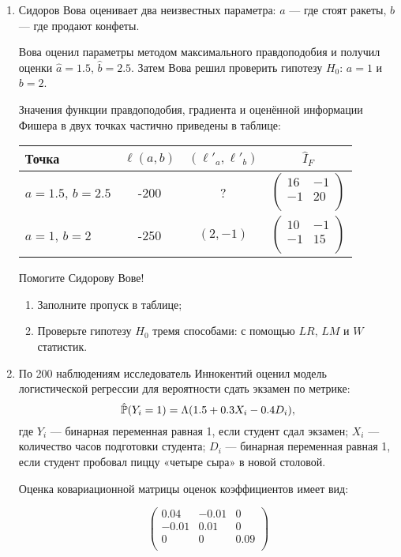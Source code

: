 \begin{enumerate}
  \item Сидоров Вова оценивает два неизвестных параметра: $a$ — где стоят ракеты, $b$ — где продают конфеты.

  Вова оценил параметры методом максимального правдоподобия и получил оценки $\hat a = 1.5$, $\hat b = 2.5$.
  Затем Вова решил проверить гипотезу $H_0$: $a=1$ и $b=2$.

  Значения функции правдоподобия, градиента и оценённой информации Фишера в двух точках
  частично приведены в таблице:


\begin{tabular}{lccc}
\toprule
Точка & $\ell(a, b)$ & $(\ell'_a, \ell'_b)$ &  $\hat I_F$ \\
\midrule
$a=1.5$, $b=2.5$ & -200 &  ? &
$\begin{pmatrix}
16 & -1 \\
-1 & 20 \\
\end{pmatrix}$ \\
$a=1$, $b=2$ & -250 &  $(2, -1)$ &
$\begin{pmatrix}
10 & -1 \\
-1 & 15 \\
\end{pmatrix}$ \\
\bottomrule
\end{tabular}

Помогите Сидорову Вове!

\begin{enumerate}
  \item Заполните пропуск в таблице;
  \item Проверьте гипотезу $H_0$ тремя способами: с помощью $LR$, $LM$ и $W$ статистик.
\end{enumerate}

\item По 200 наблюдениям исследователь Иннокентий оценил модель логистической регрессии для вероятности
сдать экзамен по метрике:
\[
\hat \P(Y_i = 1) = \Lambda(1.5 + 0.3X_i - 0.4 D_i),
\]
где $Y_i$ — бинарная переменная равная 1, если студент сдал экзамен;
$X_i$ — количество часов подготовки студента; $D_i$ — бинарная переменная равная 1,
если студент пробовал пиццу «четыре сыра» в новой столовой.

Оценка ковариационной матрицы оценок коэффициентов имеет вид:

\[
\begin{pmatrix}
0.04 & -0.01 & 0 \\
-0.01 & 0.01 & 0 \\
0 & 0 & 0.09 \\
\end{pmatrix}
\]


\end{enumerate}
